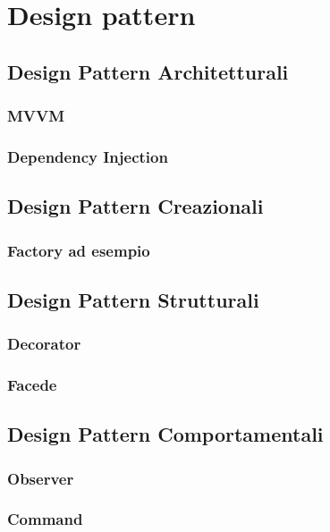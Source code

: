 \section{Design pattern}

	\subsection{Design Pattern Architetturali}
	
		\subsubsection{MVVM}
		\subsubsection{Dependency Injection}

	\subsection{Design Pattern Creazionali}
	
		\subsubsection{Factory ad esempio}
		
	\subsection{Design Pattern Strutturali}

		\subsubsection{Decorator}
		\subsubsection{Facede}
	
	\subsection{Design Pattern Comportamentali}

		\subsubsection{Observer}
		\subsubsection{Command}	